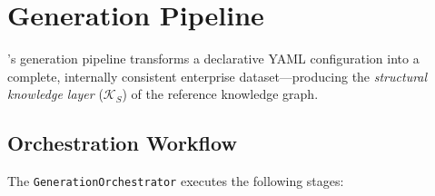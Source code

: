 \section{Generation Pipeline}
\label{sec:generation_pipeline}

\system{}'s generation pipeline transforms a declarative YAML
configuration into a complete, internally consistent enterprise
dataset---producing the \emph{structural knowledge layer}
($\mathcal{K}_S$) of the reference knowledge graph.

\subsection{Orchestration Workflow}
\label{sec:gen_orchestration}

The \texttt{GenerationOrchestrator} executes the following stages:

